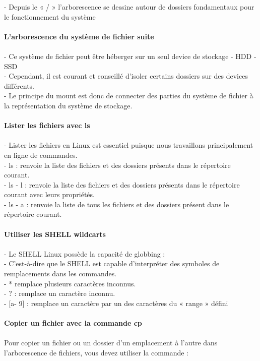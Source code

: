 \documentclass[10pt,a4paper]{article}
\begin{document}
- Depuis le « / » l’arborescence se dessine autour de dossiers fondamentaux pour le fonctionnement du système \\\\
{\large\textbf{L’arborescence du système de fichier suite}}\\\\
- Ce système de fichier peut être héberger sur un seul device de stockage - HDD - SSD \\
- Cependant, il est courant et conseillé d’isoler certains dossiers sur des devices différents.\\
- Le principe du mount est donc de connecter des parties du système de fichier à la représentation du système de stockage.\\\\
{\large\textbf{Lister les fichiers avec ls}}\\\\
- Lister les fichiers en Linux est essentiel puisque nous travaillons principalement en ligne de commandes. \\
- ls : renvoie la liste des fichiers et des dossiers présents dans le répertoire courant. \\
- ls - l : renvoie la liste des fichiers et des dossiers présents dans le répertoire courant avec leurs propriétés.\\
- ls - a : renvoie la liste de tous les fichiers et des dossiers présent dans le répertoire courant. \\\\
{\large\textbf{Utiliser les SHELL wildcarts }}\\\\
- Le SHELL Linux possède la capacité de globbing : \\
- C'est-à-dire que le SHELL est capable d’interpréter des symboles de remplacements dans les commandes. \\
- * remplace plusieurs caractères inconnus.\\
- ? : remplace un caractère inconnu.\\
- [a- 9] : remplace un caractère par un des caractères du « range » défini\\\\
{\large\textbf{Copier un fichier avec la commande cp}}\\\\
Pour copier un fichier ou un dossier d’un emplacement à l’autre dans l’arborescence de fichiers, vous devez utiliser la commande : \\\\
\end{document}
